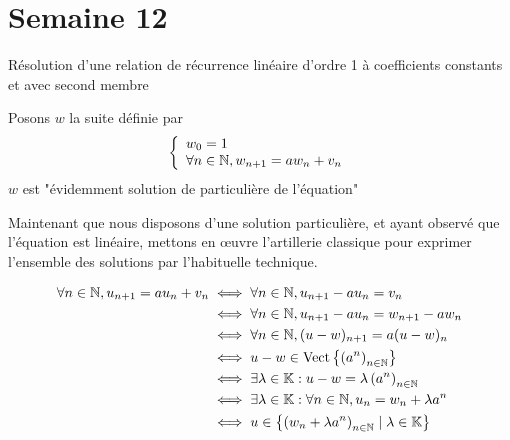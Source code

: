 \documentclass{article}
\renewenvironment{question_kholle}[2][ ]
{
	\subsection{\texorpdfstring{#2}{}}
	\notblank{#1}
	{
		\noindent #1
		\bigbreak
	}
	{}
	\begin{proof}
}
{
	\end{proof}
}
\begin{document}
\pagebreak\section{Semaine 12}

\begin{question_kholle}
  [Soient $a \in \K$ et $v \in \K^\N$ où \K peut être \C ou \R.
    L'ensemble des solutions de l'équation $\forall n \in \N, u_{n+1} = au_{n} + v_{n}$
    est la droite affine :
    \begin{equation}
      \left\{ w + \lambda \left( a^n \right) _{n \in \N} \mid \lambda \in \K \right\}
    \end{equation}
  ]
  {Résolution d'une relation de récurrence linéaire d'ordre 1 à coefficients constants et avec second membre}

  Posons $w$ la suite définie par $$
    \left\{ \begin{array}{ll}
      w_{0} = 1 \\
      \forall n \in \mathbb N, w_{n+1} = aw_{n} + v_{n}
    \end{array}\right.
  $$
  $w$ est "évidemment solution de particulière de l'équation"

  Maintenant que nous disposons d'une solution particulière, et ayant observé que l'équation est linéaire, mettons en œuvre l'artillerie classique pour exprimer l'ensemble des solutions par l'habituelle technique.


  \begin{align*}
    \forall n \in \mathbb N, u_{n+1} = au_{n} + v_{n} & \iff \forall n \in \mathbb N, u_{n+1} - au_{n} = v_{n}                                                         \\
                                                       & \iff \forall n \in \mathbb N, u_{n+1} - au_{n} = w_{n+1} - aw_{n}                                              \\
                                                       & \iff \forall n \in \mathbb N, (u-w)_{n+1} = a(u-w)_{n}                                                         \\
                                                       & \iff u-w \in \text{Vect}\left\{ \left( a^n \right) _{n \in \mathbb N} \right\}                                 \\
                                                       & \iff \exists \lambda \in \mathbb K : u-w = \lambda \left( a^{n} \right) _{n \in \mathbb N}                    \\
                                                       & \iff \exists \lambda \in \mathbb K : \forall n \in \mathbb N, u_{n} = w_{n} + \lambda a^n                     \\
                                                       & \iff  u \in \left\{ \left( w_{n} + \lambda a^n \right) _{n \in \mathbb N} \mid \lambda \in \mathbb K \right\}
  \end{align*}

\end{question_kholle}
\end{document}
